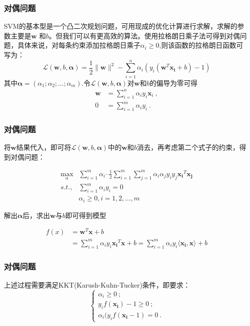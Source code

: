 \begin{frame}
\frametitle{对偶问题}
SVM的基本型是一个凸二次规划问题，可用现成的优化计算进行求解，求解的参数主要是$\boldsymbol{w}$ 和$b$。但我们可以有更高效的算法。使用拉格朗日乘子法可得到对偶问题，具体来说，对每条约束添加拉格朗日乘子$\alpha_i \ge0$,则该函数的拉格朗日函数可写为：
\[
\mathcal{L}(\boldsymbol{w},b,\boldsymbol{\alpha})=\frac{1}{2}\|\boldsymbol{w}\|^2-\sum_{i=1}^n\alpha_i \left(y_i(\boldsymbol{w}^T\boldsymbol{x_i}+b)-1\right)
\]
其中$\boldsymbol{\alpha} = (\alpha_1;\alpha_2;\dots;\alpha_m)$.令$\mathcal{L}(\boldsymbol{w},b,\boldsymbol{\alpha})$对$\boldsymbol{w}$和$b$的偏导为零可得
\begin{align*}
\boldsymbol{w} &= \sum_{i=1}^n\alpha_i y_i \boldsymbol{x}_i\ ,\\
0&=\sum_{i=1}^m\alpha_iy_i\ .
\end{align*}

\end{frame}


\begin{frame}

\frametitle{对偶问题}

将$\boldsymbol{w}$结果代入，即可将$\mathcal{L}(\boldsymbol{w},b,\boldsymbol{\alpha})$中的$\boldsymbol{w}$和$b$消去，再考虑第二个式子的约束，得到对偶问题：

\begin{align*}
 \max_\alpha &\sum_{i=1}^m\alpha_i – \frac{1}{2}\sum_{i=1}^m\sum_{j=1}^m\alpha_i\alpha_jy_iy_j\boldsymbol{x_i}^T\boldsymbol{x_j} \\ 
 s.t.,&\sum_{i=1}^m\alpha_iy_i = 0 \\
  &\alpha_i\geq 0, i=1,2,\ldots,m
 \end{align*}

解出$\boldsymbol{\alpha}$后，求出$\boldsymbol{w}$与$b$即可得到模型

\begin{align*}
f(x)&=\boldsymbol{w}^T\boldsymbol{x}+b\\
&=\sum_{i=1}^m\alpha_i y_i \boldsymbol{x_i}^T\boldsymbol{x}+b 
= \sum_{i=1}^m\alpha_i y_i \langle\boldsymbol{x_i, x}\rangle + b
\end{align*}

\end{frame}


\begin{frame}

\frametitle{对偶问题}

上述过程需要满足KKT(Karush-Kuhn-Tucker)条件，即要求：
\[ 
\begin{cases}
\alpha_i \geq0\ ; \\
y_if(\boldsymbol{x_i})-1\geq 0\ ;\\
\alpha_i(y_if(\boldsymbol{x_i}-1)=0\ .
\end{cases} 
\]

\end{frame}


